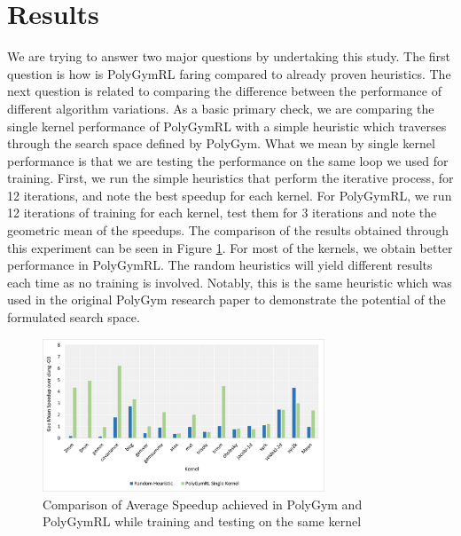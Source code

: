 \documentclass[logo,msc]{infthesis}           %
\begin{document}
\section{Results}
 We are trying to answer two major questions by undertaking this study. The first question is how is PolyGymRL faring compared to already proven heuristics. The next question is related to comparing the difference between the performance of different algorithm variations. As a basic primary check, we are comparing the single kernel performance of PolyGymRL with a simple heuristic which traverses through the search space defined by PolyGym. What we mean by single kernel performance is that we are testing the performance on the same loop we used for training. First, we run the simple heuristics that perform the iterative process, for 12 iterations, and note the best speedup for each kernel. For PolyGymRL, we run 12 iterations of training for each kernel, test them for 3 iterations and note the geometric mean of the speedups. The comparison of the results obtained through this experiment can be seen in Figure \ref{fig:single_PolyGym_PolyGymRL}. For most of the kernels, we obtain better performance in PolyGymRL. The random heuristics will yield different results each time as no training is involved. Notably, this is the same heuristic which was used in the original PolyGym research paper to demonstrate the potential of the formulated search space.

 \begin{figure}[htbp]
  \centering
  \includegraphics[width=0.75\textwidth]{Images/Chart_Single_PolyGym_PolyGymRL.png}    
  \caption{Comparison of Average Speedup achieved in PolyGym and PolyGymRL while training and testing on the same kernel}
  \label{fig:single_PolyGym_PolyGymRL}
\end{figure}
\end{document}

